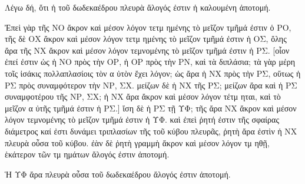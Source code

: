 \begin{Parallel}{}{}
{{\greekfont Λέγω δή, ὅτι ἡ τοῦ δωδεκαέδρου πλευρὰ ἄλογός
ἐστιν ἡ καλουμένη ἀποτομή.}

{\greekfont Ἐπεὶ γὰρ τῆς ΝΟ ἄκρον καὶ μέσον λόγον τετμ ημένης τὸ
μεῖζον τμῆμά ἐστιν ὁ ΡΟ, τῆς δὲ ΟΧ ἄκρον καὶ μέσον
λόγον τετμ ημένης τὸ μεῖζον τμῆμά ἐστιν ἡ ΟΣ, ὅλης ἄρα
τῆς ΝΧ ἄκρον καὶ μέσον λόγον
τεμνομένης τὸ μεῖζον τμῆμά ἐστιν ἡ ΡΣ. [οἷον ἐπεί
ἐστιν ὡς ἡ ΝΟ πρὸς τὴν ΟΡ, ἡ ΟΡ πρὸς τὴν ΡΝ, καὶ
τὰ διπλάσια; τὰ γὰρ μέρη τοῖς ἰσάκις πολλαπλασίοις
τὸν α ὐτὸν ἔχει λόγον; ὡς ἄρα ἡ ΝΧ πρὸς τὴν ΡΣ, οὕτως
ἡ ΡΣ πρὸς συναμφότερον τὴν ΝΡ, ΣΧ. μείζων δὲ ἡ ΝΧ
τῆς ΡΣ; μείζων ἄρα καὶ ἡ ΡΣ συναμφοτέρου τῆς ΝΡ, ΣΧ; ἡ ΝΧ
ἄρα ἄκρον  καὶ μέσον λόγον τέτμ ηται, καὶ
  τὸ μεῖζον  α ὐτῆς τμῆμά
ἐστιν ἡ ΡΣ.] ἴση δὲ ἡ ΡΣ τῇ ΥΦ; τῆς ἄρα ΝΧ ἄκρον
καὶ μέσον λόγον τεμνομένης τὸ μεῖζον τμῆμά ἐστιν ἡ
ΥΦ. καὶ ἐπεὶ ῥητή ἐστιν τῆς σφαίρας διάμετρος
καί ἐστι δυνάμει τριπλασίων τῆς τοῦ κύβου πλευρᾶς, ῥητὴ
ἄρα ἐστὶν ἡ ΝΧ πλευρὰ οὖσα τοῦ κύβου. ἐὰν δὲ
ῥητὴ γραμμὴ ἄκρον καὶ μέσον λόγον τμ ηθῇ, ἑκάτερον
τῶν τμ ημάτων ἄλογός ἐστιν ἀποτομή.}

{\greekfont Ἡ ΥΦ ἄρα πλευρὰ οὖσα τοῦ δωδεκαέδρου ἄλογός
ἐστιν ἀποτομή.}}

\end{Parallel}
